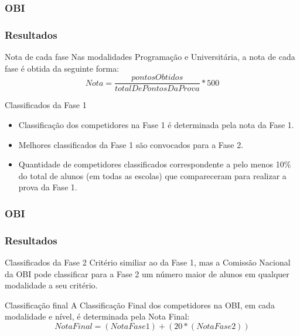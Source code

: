 \begin{frame}
	\frametitle{OBI}
	\frametitle{Resultados}
 
	\begin{block:fact}{Nota de cada fase}
		Nas modalidades Programação e Universitária, a nota de cada fase é obtida da seguinte forma:
		\begin{equation}
			Nota = \frac{pontosObtidos}{totalDePontosDaProva} * 500
		\end{equation}
	\end{block:fact}
	
	\begin{block:fact}{Classificados da Fase 1}
		\begin{itemize}
			\item Classificação dos competidores na Fase 1 é determinada pela nota da
			Fase 1.
			\item Melhores classificados da Fase 1 são convocados para a Fase 2.
		
		  \item Quantidade de competidores classificados correspondente a pelo menos
			10\% do total de alunos (em todas as escolas) que compareceram para realizar
			a prova da Fase 1.
		\end{itemize}
	\end{block:fact}
\end{frame}


\begin{frame}
	\frametitle{OBI}
	\frametitle{Resultados}
 
	\begin{block:fact}{Classificados da Fase 2}
		Critério similiar ao da Fase 1, mas a Comissão Nacional da OBI pode
		classificar para a Fase 2 um número maior de alunos em qualquer modalidade
		a seu critério.
	\end{block:fact}
	
	\begin{block:fact}{Classificação final}
		A Classificação Final dos competidores na OBI, em cada modalidade e nível,
		é determinada pela Nota Final:
		\begin{equation}
			Nota Final = (Nota Fase 1) + (20 * (Nota Fase 2))
		\end{equation}
	\end{block:fact}
\end{frame}